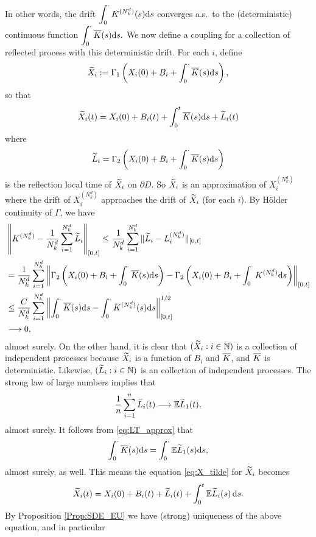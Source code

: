 In other words, the drift $\displaystyle \int_0^\cdot K^{(N_k^d)}(s)\mathrm{d} s$ converges a.s.\ to the (deterministic) continuous function $\displaystyle \int_0^\cdot \overline{K}(s) \mathrm{d} s.$ We now define a coupling for a collection of reflected process with this deterministic drift. For each $i$, define
\begin{align}
	\widetilde{X}_i := \Gamma_1\left(X_i(0) + B_i + \int_0^\cdot \overline{K}(s)\mathrm{d} s\right),
\end{align}
so that
\[
\widetilde{X}_i(t) = X_i(0) + B_i(t) + \int_0^t \overline{K}(s) \mathrm{d} s + \widetilde{L}_i(t)
\]
where 
\begin{align}\label{eq:X_tilde}
	\widetilde{L}_i = \Gamma_2\left(X_i(0) + B_i + \int_0^\cdot \overline{K}(s)\mathrm{d} s \right)
\end{align}
is the reflection local time of $\widetilde{X}_i$ on $\partial D.$ So $\widetilde{X}_i$ is an approximation of $X_i^{(N_k^d)}$  where the drift of $X_i^{(N_k^d)}$ approaches the drift of $\widetilde{X}_i$ (for each $i$). By H\"older continuity of $\Gamma$, we have
\begin{align}
	\begin{split}\label{eq:LT_approx}
		&\left\|K^{(N_k^d)} - \frac{1}{N_k^d}\sum_{i = 1}^{N_k^d}\widetilde{L}_i\right\|_{[0, t]} \leq \frac{1}{N_k^d}\sum_{i = 1}^{N_k^d}\|\widetilde{L}_i - L_i^{(N_k^d)}\|_{[0, t]}\\
		&= \frac{1}{N_k^d}\sum_{i = 1}^{N_k^d}\left\|\Gamma_2\left(X_i(0) + B_i + \int_0^\cdot \overline{K}(s)\mathrm{d} s \right) - \Gamma_2\left(X_i(0) + B_i + \int_0^\cdot K^{(N_k^d)}\mathrm{d} s \right)\right\|_{[0, t]}\\
		&\leq \frac{C}{N_k^d}\sum_{i = 1}^{N_k^d}\left\|\int_0^\cdot \overline{K}(s) \mathrm{d} s - \int_0^\cdot K^{(N_k^d)}(s)\mathrm{d} s\right\|_{[0, t]}^{1/2}\\
		&\longrightarrow 0,
	\end{split}
\end{align}
almost surely. On the other hand, it is clear that $(\widetilde{X}_i : i \in \mathbb{N})$ is a collection of independent processes because $\widetilde{X}_i$ is a function of $B_i$ and $\overline{K}$, and $\overline{K}$ is deterministic. Likewise,
$(\widetilde{L}_i : i \in \mathbb{N})$ is an collection of independent processes. The strong law of large numbers implies that
\[
\frac{1}{n}\sum_{i = 1}^n \widetilde{L}_i(t) \longrightarrow \mathbb{E} \widetilde{L}_1(t),
\]
almost surely. It follows from \eqref{eq:LT_approx} that 
\[
\int_0^\cdot \overline{K}(s) \mathrm{d} s = \int_0^\cdot \mathbb{E} \widetilde{L}_1(s)\mathrm{d} s,
\]
almost surely, as well. This means the equation \eqref{eq:X_tilde} for $\widetilde{X}_i$ becomes
\[
\widetilde{X}_i(t) = X_i(0) + B_i(t) + \widetilde{L}_i(t) + \int_0^t\mathbb{E}\widetilde{L}_i(s)\,\mathrm{d} s.
\]
By Proposition \ref{Prop:SDE_EU} we have (strong) uniqueness of the above equation, and in particular
